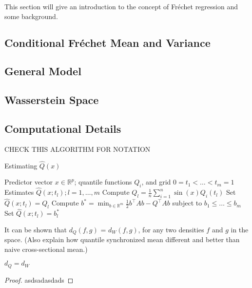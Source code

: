 This section will give an introduction to the concept of Fréchet regression
and some background.

\subsection{Conditional Fréchet Mean and Variance}
\label{sec:condmean}

\subsection{General Model}
\label{sec:general}

\subsection{Wasserstein Space}
\label{sec:wasserstein_space}

\subsection{Computational Details}
\label{sec:computation}

CHECK THIS ALGORITHM FOR NOTATION
\begin{algorithm}
    \caption{Estimating \(\hat{Q}(x)\)}
    \label{alg:quadprog}
    \begin{algorithmic}[1]
    \Require Predictor vector \( x \in \mathbb{R}^p \); quantile functions \( Q_i \), and grid \( 0 = t_1 < \ldots < t_m = 1 \)
    \Ensure Estimates \( \hat{Q}(x; t_l); l = 1, \ldots, m \)
        \State Compute \( Q_l = \frac{1}{n} \sum_{i=1}^{n} \sin(x) Q_i(t_l) \)
    \EndFor
        \State Set \( \hat{Q}(x; t_l) = Q_l \)
    \Else
        \State Compute \( b^* = \min_{b \in \mathbb{R}^m} \frac{1}{2} b^\top A b - Q^\top A b \) subject to \( b_1 \leq \ldots \leq b_m \)
        \State Set \( \hat{Q}(x; t_l) = b^*_l \)
    \EndIf
    \end{algorithmic}
\end{algorithm}

It can be shown that $d_Q(f,g)$ = $d_W(f,g)$, for any two densities $f$ and $g$ in the
space. (Also explain how quantile synchronized mean different and better than naive
cross-sectional mean.)
\begin{lemma}
    \label{lemma:dqeqdw}
    $d_Q = d_W$
\end{lemma}
\begin{proof}
    asdsadasdads
\end{proof}

